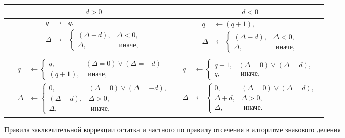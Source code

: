 \begin{figure}[!ht]
    \centering
	\begin{tabular}{c||c|c}
			& $d> 0$
				& $d < 0$\\
		\hline\hline
		\rotatebox{90}{$A\ge 0$}
			& 
			\parbox[c]{.3\textwidth}{
				\begin{align*}
					q&\gets q,\\
					\Delta&\gets 
					\begin{cases}
						(\Delta + d), & \Delta < 0, \\
						\Delta,      &\text{ иначе,}
					\end{cases}
				\end{align*}
			}
				& 
				\parbox[c]{.3\textwidth}{
					\begin{align*}
						q&\gets (q+1),\\
						\Delta&\gets 
						\begin{cases}
							(\Delta - d), & \Delta < 0, \\
							\Delta,       &\text{ иначе,}
						\end{cases}
					\end{align*}
				}
				\\
		\hline
			& 
			\parbox[c]{.3\textwidth}{
				\begin{align*}
					q&\gets 
					\begin{cases}
						q,      & (\Delta = 0) \lor (\Delta = -d) \\
						(q+1),  &\text{ иначе,}
					\end{cases}
					\\
					\Delta&\gets 
					\begin{cases}
						0,          & (\Delta = 0) \lor (\Delta = -d), \\
						(\Delta-d), & \Delta > 0, \\
						\Delta,     & \text{ иначе,}
					\end{cases}
				\end{align*}
			}
				& 
				\parbox[c]{.3\textwidth}{
					\begin{align*}
						q&\gets 
						\begin{cases}
							q+1, & (\Delta = 0) \lor (\Delta = d), \\
							q,   &\text{ иначе,}
						\end{cases}
						\\
						\Delta&\gets 
						\begin{cases}
							0,        & (\Delta = 0) \lor (\Delta = d), \\
							\Delta+d, & \Delta > 0, \\
							\Delta,   & \text{ иначе.}
						\end{cases}
					\end{align*}
				} \\ 
	\end{tabular}
	
    \caption{Правила заключительной коррекции остатка и частного по правилу отсечения в алгоритме знакового деления}
    \label{t:div:int:Signed:Correction}
\end{figure}


